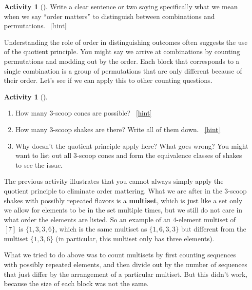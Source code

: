\documentclass[10pt,]{book}
\newcommand{\terminology}[1]{\textbf{#1}}
\theoremstyle{plain}
\theoremstyle{definition}
\theoremstyle{definition}
\theoremstyle{definition}
\newtheorem{activity}[project]{Activity}
\numberwithin{equation}{chapter}
\begin{document}
\begin{activity}[]\label{activity-111}
\hypertarget{p-801}{}%
Write a clear sentence or two saying specifically what we mean when we say ``order matters'' to distinguish between combinations and permutations.%
~\hfill{\tiny\hyperlink{a-118}{[hint]}\hypertarget{q-118}{}}\end{activity}
\hypertarget{p-803}{}%
Understanding the role of order in distinguishing outcomes often suggests the use of the quotient principle.  You might say we arrive at combinations by counting permutations and modding out by the order.  Each block that corresponds to a single combination is a group of permutations that are only different because of their order.  Let's see if we can apply this to other counting questions.%
\begin{activity}[]\label{activity-112}
\begin{enumerate}[font=\bfseries,label=(\alph*),ref=\alph*]
\item\label{task-152} \hypertarget{p-804}{}%
How many 3-scoop cones are possible?%
~\hfill{\tiny\hyperlink{a-119.a}{[hint]}\hypertarget{q-119.a}{}}\item\label{task-153} \hypertarget{p-806}{}%
How many 3-scoop shakes are there?  Write all of them down.%
~\hfill{\tiny\hyperlink{a-119.b}{[hint]}\hypertarget{q-119.b}{}}\item\label{task-154} \hypertarget{p-808}{}%
Why doesn't the quotient principle apply here?  What goes wrong?  You might want to list out all 3-scoop cones and form the equivalence classes of shakes to see the issue.%
\end{enumerate}
\end{activity}
\hypertarget{p-809}{}%
The previous activity illustrates that you cannot always simply apply the quotient principle to eliminate order mattering.  What we are after in the 3-scoop shakes with possibly repeated flavors is a \terminology{multiset}, which is just like a set only we allow for elements to be in the set multiple times, but we still do not care in what order the elements are listed.  So an example of an \(4\)-element multiset of \([7]\) is \(\{1,3,3,6\}\), which is the same multiset as \(\{1,6,3,3\}\) but different from the multiset \(\{1,3,6\}\) (in particular, this multiset only has three elements).%
\par
\hypertarget{p-810}{}%
What we tried to do above was to count multisets by first counting sequences with possibly repeated elements, and then divide out by the number of sequences that just differ by the arrangement of a particular multiset.  But this didn't work, because the size of each block was not the same.%
\end{document}
